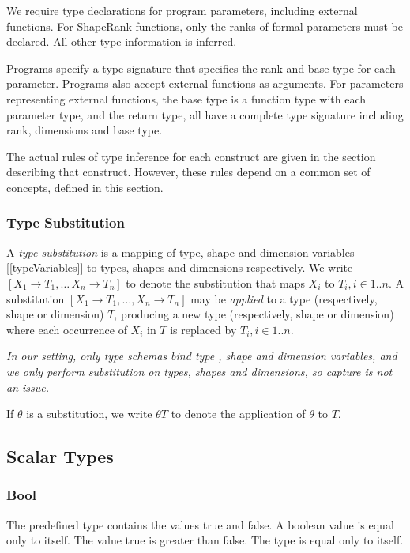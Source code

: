 \documentclass{article}
\begin{document}
{We require type declarations for program parameters, including external functions.
For ShapeRank functions, only the ranks of formal parameters must be declared. All other type information is inferred.

Programs specify a type signature that specifies the rank and base type for each parameter. Programs also accept external functions as arguments.
For parameters representing external functions, the base type is  a function type with each parameter type, and the return type, all have a complete type signature including rank, dimensions and base type.

The actual rules of type inference for each construct are given in the section describing that construct. However, these rules depend on a common set of concepts, defined in this section.
 
  
  \subsubsection{Type Substitution}
  \label{typeSubstitution}
  
  A {\em type substitution} is a mapping of type, shape and dimension variables [\ref{typeVariables}] to types, shapes and dimensions respectively. We write $[X_1 \to T_1, \ldots\, X_n \to T_n]$ to denote the substitution that maps $X_i$ to $T_i, i \in 1..n$. A substitution $[X_1 \to T_1, \ldots, X_n \to T_n]$ may be {\em applied} to a type (respectively, shape or dimension) $T$, producing a new type (respectively, shape or dimension) where each occurrence of $X_i$ in $T$ is replaced by $T_i ,i \in 1..n$.
  
  {\em 
  In our setting, only type schemas bind type , shape and dimension variables, and we only perform substitution on types, shapes and dimensions, so capture is not an issue.
  }
  
If $\theta$ is a substitution, we write $\theta T$ to denote the application of $\theta$ to $T$.


\subsection{Scalar Types}
\label{scalarTypes}

\subsubsection{Bool}
\label{bool}

The predefined type \BOOL{} contains the values true and false.  A boolean value is equal only to itself. The value true is greater than false. The type \BOOL{} is equal only to itself.

}
\end{document}
